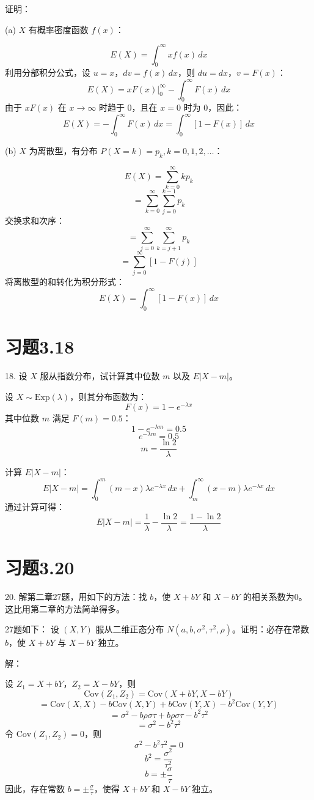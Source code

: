 \documentclass[UTF8]{report}
\theoremstyle{MyLineTheoremStyle} %
\theoremstyle{MyBlockTheoremStyle} %
\theoremstyle{MySubsubsectionStyle} %
\begin{document}
证明：

(a) \(X\) 有概率密度函数 \(f(x)\)：

\[
E(X) = \int_{0}^{\infty} x f(x) \, dx
\]
利用分部积分公式，设 \(u = x\)，\(dv = f(x) \, dx\)，则 \(du = dx\)，\(v = F(x)\)：
\[
E(X) = \left. x F(x) \right|_0^\infty - \int_{0}^{\infty} F(x) \, dx
\]
由于 \(x F(x)\) 在 \(x \to \infty\) 时趋于 0，且在 \(x = 0\) 时为 0，因此：
\[
E(X) = - \int_{0}^{\infty} F(x) \, dx = \int_{0}^{\infty} [1 - F(x)] \, dx
\]

(b) \(X\) 为离散型，有分布 \(P(X=k)=p_k, k=0,1,2,\ldots\)：

\[
E(X) = \sum_{k=0}^{\infty} k p_k
\]
\[
= \sum_{k=0}^{\infty} \sum_{j=0}^{k-1} p_k
\]
交换求和次序：
\[
= \sum_{j=0}^{\infty} \sum_{k=j+1}^{\infty} p_k
\]
\[
= \sum_{j=0}^{\infty} [1 - F(j)]
\]
将离散型的和转化为积分形式：
\[
E(X) = \int_{0}^{\infty} [1 - F(x)] \, dx
\]

\section{习题3.18}

18. 设 \(X\) 服从指数分布，试计算其中位数 \(m\) 以及 \(E|X-m|\)。

设 \(X \sim \text{Exp}(\lambda)\)，则其分布函数为：
\[
F(x) = 1 - e^{-\lambda x}
\]
其中位数 \(m\) 满足 \(F(m) = 0.5\)：
\[
1 - e^{-\lambda m} = 0.5
\]
\[
e^{-\lambda m} = 0.5
\]
\[
m = \frac{\ln 2}{\lambda}
\]

计算 \(E|X - m|\)：
\[
E|X - m| = \int_{0}^{m} (m - x) \lambda e^{-\lambda x} \, dx + \int_{m}^{\infty} (x - m) \lambda e^{-\lambda x} \, dx
\]
通过计算可得：
\[
E|X - m| = \frac{1}{\lambda} - \frac{\ln 2}{\lambda} = \frac{1 - \ln 2}{\lambda}
\]

\section{习题3.20}

20. 解第二章27题，用如下的方法：找 \(b\)，使 \(X + bY\) 和 \(X - bY\) 的相关系数为0。这比用第二章的方法简单得多。

27题如下：  
设 \((X, Y)\) 服从二维正态分布 \(N(a, b, \sigma^2, \tau^2, \rho)\)。证明：必存在常数 \(b\)，使 \(X + bY\) 与 \(X - bY\) 独立。

解：

设 \(Z_1 = X + bY\)，\(Z_2 = X - bY\)，则
\[
\text{Cov}(Z_1, Z_2) = \text{Cov}(X + bY, X - bY)
\]
\[
= \text{Cov}(X, X) - b \text{Cov}(X, Y) + b \text{Cov}(Y, X) - b^2 \text{Cov}(Y, Y)
\]
\[
= \sigma^2 - b \rho \sigma \tau + b \rho \sigma \tau - b^2 \tau^2
\]
\[
= \sigma^2 - b^2 \tau^2
\]
令 \(\text{Cov}(Z_1, Z_2) = 0\)，则
\[
\sigma^2 - b^2 \tau^2 = 0
\]
\[
b^2 = \frac{\sigma^2}{\tau^2}
\]
\[
b = \pm \frac{\sigma}{\tau}
\]
因此，存在常数 \(b = \pm \frac{\sigma}{\tau}\)，使得 \(X + bY\) 和 \(X - bY\) 独立。
\end{document}
